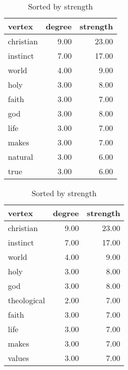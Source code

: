 \documentclass[letterpaper, 10 pt, conference]{article}
\begin{document}
\begin{table}
	\caption{Highest degree and strength vertices for largest connected component in the network.}
	\begin{subtable}[ht]{0.45\textwidth}
		\centering
		\caption{Sorted by degree.}
		\centering
		\begin{tabular}{lrr}
			\hline
			vertex & degree & strength \\ 
			\hline
			christian & 9.00 & 23.00 \\ 
			instinct & 7.00 & 17.00 \\ 
			world & 4.00 & 9.00 \\ 
			holy & 3.00 & 8.00 \\ 
			faith & 3.00 & 7.00 \\ 
			god & 3.00 & 8.00 \\ 
			life & 3.00 & 7.00 \\ 
			makes & 3.00 & 7.00 \\ 
			natural & 3.00 & 6.00 \\ 
			true & 3.00 & 6.00 \\ 
			\hline
		\end{tabular}
	\end{subtable}
	\hfill
	\begin{subtable}[ht]{0.45\textwidth}
		\centering
		\caption{Sorted by strength}
			\centering
			\begin{tabular}{lrr}
				\hline
				vertex & degree & strength \\ 
				\hline
				christian & 9.00 & 23.00 \\ 
				instinct & 7.00 & 17.00 \\ 
				world & 4.00 & 9.00 \\ 
				holy & 3.00 & 8.00 \\ 
				god & 3.00 & 8.00 \\ 
				theological & 2.00 & 7.00 \\ 
				faith & 3.00 & 7.00 \\ 
				life & 3.00 & 7.00 \\ 
				makes & 3.00 & 7.00 \\ 
				values & 3.00 & 7.00 \\ 
				\hline
			\end{tabular}
	\end{subtable}
	\label{tab:degree-strength}
\end{table}
\end{document}
